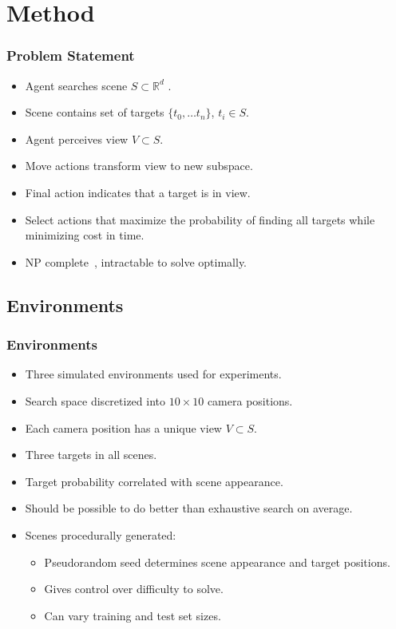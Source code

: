 \section{Method}

\begin{frame}
    \frametitle{Problem Statement}

    \begin{itemize}
        \item Agent searches scene \(S \subset \mathbb{R}^d\) .
        \item Scene contains set of targets \(\{t_0, \dots t_n\}\), \(t_i \in S\).
        \item Agent perceives view \(V \subset S\).
        \item Move actions transform view to new subspace.
        \item Final action indicates that a target is in view.
        \item Select actions that maximize the probability of finding all targets while minimizing cost in time.
        \item NP complete~\cite{andreopoulos_theory_2009}, intractable to solve optimally.
    \end{itemize}
\end{frame}

\subsection{Environments}

\begin{frame}
    \frametitle{Environments}
    
    \begin{itemize}
        \item Three simulated environments used for experiments.
        \item Search space discretized into \(10 \times 10\) camera positions.
        \item Each camera position has a unique view \(V \subset S\).
        \item Three targets in all scenes.
        \item Target probability correlated with scene appearance.
        \item Should be possible to do better than exhaustive search on average.
        \item Scenes procedurally generated:
        \begin{itemize}
            \item Pseudorandom seed determines scene appearance and target positions.
            \item Gives control over difficulty to solve.
            \item Can vary training and test set sizes.
        \end{itemize}
    \end{itemize}
\end{frame}

